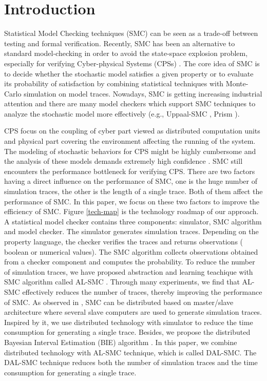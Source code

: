 \section{Introduction}

Statistical Model Checking techniques (SMC)\cite{Younes2004Planning,Sen2004Statistical,herault2004} can be seen as a trade-off between testing and formal verification. Recently, SMC has been an alternative to standard model-checking in order to avoid the state-space explosion problem, especially for verifying Cyber-physical Systems (CPSs) \cite{Yoo2016Challenges}. The core idea of SMC is to decide whether the stochastic model satisfies a given property or to evaluate its probability of satisfaction by combining statistical techniques with Monte-Carlo simulation on model traces. Nowadays, SMC is getting increasing industrial attention and there are many model checkers which support SMC techniques to analyze the stochastic model more effectively (e.g., Uppaal-SMC \cite{Bulychev2012UPPAAL}, Prism \cite{Kwiatkowska2002PRISM}).

CPS focus on the coupling of cyber part viewed as distributed computation units and physical part covering the environment affecting the running of the system. The modeling of stochastic behaviors for CPS might be highly cumbersome \cite{basu2010statistical} and the analysis of these models demands extremely high confidence \cite{du2015smc4rare}. SMC still encounters the performance bottleneck for verifying CPS. There are two factors having a direct influence on the performance of SMC, one is the huge number of simulation traces, the other is the length of a single trace. Both of them affect the performance of SMC. In this paper, we focus on these two factors to improve the efficiency of SMC. Figure \ref{tech-map} is the technology roadmap of our approach. A statistical model checker contains three components: simulator, SMC algorithm and model checker. The simulator generates simulation traces. Depending on the property
language, the checker verifies the traces and returns observations ( boolean or numerical values). The SMC algorithm collects observations obtained from a checker component and computes the probability. To reduce the number of simulation traces, we have proposed abstraction and learning teachique with SMC algorithm called AL-SMC \cite{jiangkaiqiang2016}. Through many experiments, we find that AL-SMC effectively reduces the number of traces, thereby improving the performance of SMC. As observed in \cite{younes2005ymer}, SMC can be distributed based on master/slave architecture where several slave computers are used to generate simulation traces. Inspired by it, we use distributed technology with simulator to reduce the time consumption for generating a single trace. Besides, we propose the distributed Bayesian Interval Estimation (BIE) algorithm \cite{zuliani2013bayesian}. In this paper, we combine distributed technology with AL-SMC technique, which is called DAL-SMC. The DAL-SMC technique reduces both the number of simulation traces and the time consumption for generating a single trace.

